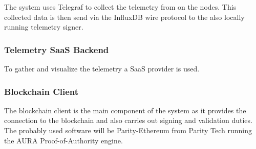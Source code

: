 The system uses Telegraf to collect the telemetry from on the nodes. This collected data is then send via the InfluxDB wire protocol to the also locally running telemetry signer.

\subsubsection{Telemetry SaaS Backend}

To gather and visualize the telemetry a SaaS provider is used.

\subsubsection{Blockchain Client}

The blockchain client is the main component of the system as it provides the connection to the blockchain and also carries out signing and validation duties. 
The probably used software will be Parity-Ethereum from Parity Tech running the AURA Proof-of-Authority engine.

